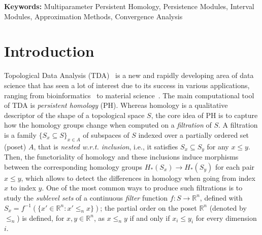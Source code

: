 \documentclass{article}
\newcommand{\simpcomp}{S}
\newcommand{\R}{\mathbb{R}}
\newcommand{\leqn}{\leq_n}
\begin{document}
\ifARXIV{}
\hfill{{\footnotesize\textbf{Keywords:} Multiparameter Persistent Homology, Persistence Modules, Interval Modules, Approximation Methods, Convergence Analysis}}
\else
{}
\fi


\section{Introduction}

Topological Data Analysis (TDA)~\cite{edelsbrunnerComputationalTopologyIntroduction2010,
oudotPersistenceTheoryQuiver2015}
is a new and rapidly developing area of data science that has seen a lot of interest due to its success in various applications,
ranging from
bioinformatics~\cite{Rabadan2019} to material science~\cite{Buchet2018}. 
The main computational tool of TDA is {\em persistent homology} (PH).  
Whereas homology is a qualitative descriptor of the shape of a topological space $\simpcomp$,
the core idea of PH is to capture how the homology groups change 
when computed on a {\em filtration} of $\simpcomp$. 
A filtration is a family $\{\simpcomp_x\subseteq \simpcomp\}_{x\in A}$ %
of subspaces of $\simpcomp$ indexed over a partially ordered set (poset) $A$,
that is {\em nested w.r.t. inclusion}, i.e., it satisfies
$\simpcomp_x\subseteq \simpcomp_y$ for any $x\leq y$. 
Then, 
the functoriality of homology and these inclusions induce morphisms between the corresponding 
homology groups $H_*(\simpcomp_x) \rightarrow H_*(\simpcomp_y)$ for each pair
$x\leq y$, which allows to detect the differences in homology when going from
index $x$ to index $y$.
One of the most common ways to produce such filtrations %
is to study the {\em sublevel sets} of a continuous {\em filter} function $f:\simpcomp\rightarrow \R^n$, 
defined with $\simpcomp_x=f^{-1}(\{x'\in \R^n : x'\leqn x\})$; %
the partial order on the poset $ \R^n$ (denoted by $\leqn$) is defined, for $x,y\in\R^n$, as $x \leqn y$ if and only if  $x_i \leq y_i$ for every dimension $i$. 
\end{document}
